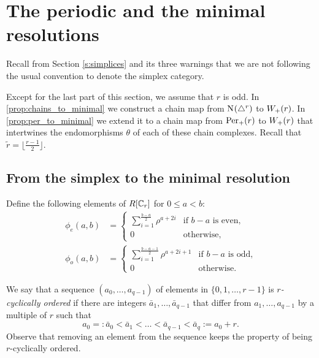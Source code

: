 
\section{The periodic and the minimal resolutions}\label{s:per_to_minimal}

\begin{warning}
Recall from Section \cref{s:simplices} and its three warnings that we are not following the usual convention to denote the simplex category.
\end{warning}

Except for the last part of this section, we assume that $r$ is odd. In \cref{prop:chains_to_minimal} we construct a chain map from $\operatorname{N}_{}(\triangle^{r})$ to $W_+(r)$. In \cref{prop:per_to_minimal} we extend it to a chain map from $\mathrm{Per}_+(r)$ to $W_+(r)$ that intertwines the endomorphisms $\theta$ of each of these chain complexes. Recall that $\tilde{r} = \lfloor \frac{r-1}{2}\rfloor$.

\subsection{From the simplex to the minimal resolution}

Define the following elements of $R[\mathbb{C}_r]$ for $0\leq a<b$:
\begin{align*}
	\phi_{e}(a,b) &= \begin{cases}
		\displaystyle \sum_{i=1}^{\frac{b-a}{2}} \rho^{a+2i} & \text{if $b-a$ is even,} \\
		0 & \text{otherwise,}
	\end{cases}
	\\
	\phi_{o}(a,b) &= \begin{cases}
		\displaystyle \sum_{i=1}^{\frac{b-a-1}{2}} \rho^{a+2i+1} & \text{if $b-a$ is odd,} \\
		0 & \text{otherwise.}
	\end{cases}
\end{align*}

We say that a sequence $(a_0,\dots, a_{q-1})$ of elements in $\{0, 1, \dots, r-1\}$ is \emph{$r$-cyclically ordered} if there are integers $\bar{a}_1,\dots,\bar{a}_{q-1}$ that differ from $a_1,\dots,a_{q-1}$ by a multiple of $r$ such that 
\[
a_0=:\bar{a}_0<\bar{a}_1<\dots<\bar{a}_{q-1}<\bar{a}_q:=a_0+r.
\]
Observe that removing an element from the sequence keeps the property of being $r$-cyclically ordered.


